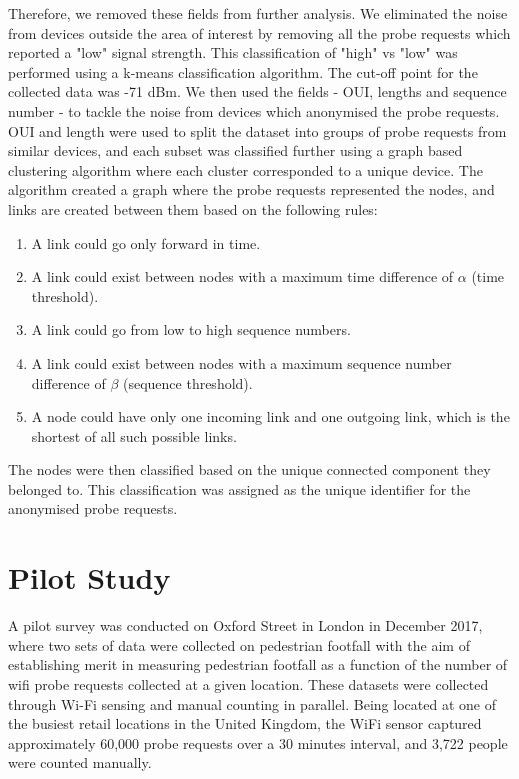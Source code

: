 \documentclass[11t, a4paper, twocolumn]{article}
\begin{document}
		Therefore, we removed these fields from further analysis.
		We eliminated the noise from devices outside the area of interest by removing all the probe requests which reported a "low" signal strength.
		This classification of "high" vs "low" was performed using a k-means classification algorithm.
		The cut-off point for the collected data was -71 dBm.
		We then used the fields - OUI, lengths and sequence number - to tackle the noise from devices which anonymised the probe requests.
		OUI and length were used to split the dataset into groups of probe requests from similar devices, and each subset was classified further using a graph based clustering algorithm where each cluster corresponded to a unique device.
		The algorithm created a graph where the probe requests represented the nodes, and links are created between them based on the following rules: 
		
			\begin{enumerate}
				\item A link could go only forward in time. 
				\item A link could exist between nodes with a maximum time difference of $\alpha$ (time threshold).
				\item A link could go from low to high sequence numbers.
				\item A link could exist between nodes with a maximum sequence number difference of $\beta$ (sequence threshold).
				\item A node could have only one incoming link and one outgoing link, which is the shortest of all such possible links.
			\end{enumerate}

		The nodes were then classified based on the unique connected component they belonged to.
		This classification was assigned as the unique identifier for the anonymised probe requests.
	
	\section{Pilot Study}\label{data}
		A pilot survey was conducted on Oxford Street in London in December 2017, where two sets of data were collected on pedestrian footfall with the aim of establishing merit in measuring pedestrian footfall as a function of the number of wifi probe requests collected at a given location.
		These datasets were collected through Wi-Fi sensing and manual counting in parallel.
		Being located at one of the busiest retail locations in the United Kingdom, the WiFi sensor captured approximately 60,000 probe requests over a 30 minutes interval, and 3,722 people were counted manually.
		
\end{document}
